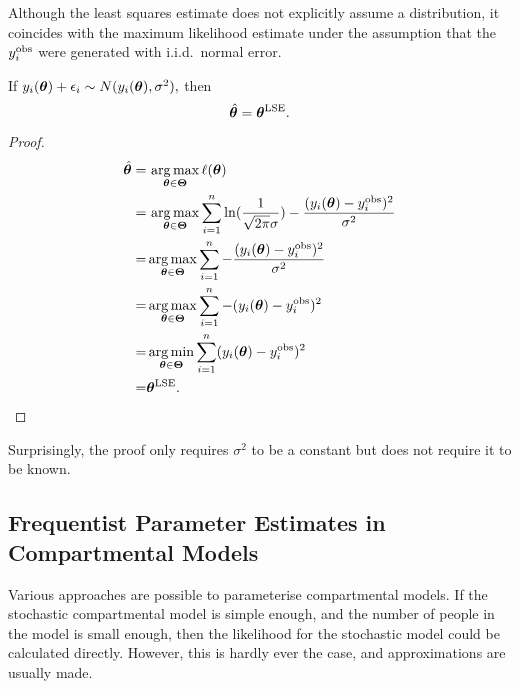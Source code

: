 Although the least squares estimate does not explicitly assume a distribution,
it coincides with the maximum likelihood estimate under the assumption that
the $y_i^{\mathrm{obs}}$ were generated with i.i.d.\ normal error.

\begin{theorem}\label{thm:LSE_normal}
    If $y_i(\bm{\theta}) + \epsilon_i \sim N(y_i(\bm{\theta}), \sigma^2),$ then
    $$
        \hat{\bm{\theta}} = \bm{\theta}^{\mathrm{LSE}}.
    $$
\end{theorem}

\begin{proof}
    \begin{align*}
        \hat{\bm{\theta}}
        = & \, \operatorname*{arg\,max}_{\bm{\theta}\in\mathbf{\Theta}}\ell(\bm{\theta}) \\
        = & \, \operatorname*{arg\,max}_{\bm{\theta}\in\mathbf{\Theta}}
        \sum_{i = 1}^n
        \ln(\frac{1}{\sqrt{2\pi}\sigma})
        -\frac{(y_i(\bm{\theta})- y_i^{\mathrm{obs}})^2}{\sigma^2}            \\
        = & \operatorname*{arg\,max}_{\bm{\theta}\in\mathbf{\Theta}} \sum_{i = 1}^n
        - \frac{(y_i(\bm{\theta})- y_i^{\mathrm{obs}})^2 }{\sigma^2}          \\
        = & \operatorname*{arg\,max}_{\bm{\theta}\in\mathbf{\Theta}} \sum_{i = 1}^n
        - (y_i(\bm{\theta})- y_i^{\mathrm{obs}})^2                            \\
        = & \operatorname*{arg\,min}_{\bm{\theta}\in\mathbf{\Theta}} \sum_{i = 1}^n
        (y_i(\bm{\theta})- y_i^{\mathrm{obs}})^2                              \\
        = & \bm{\theta}^{\mathrm{LSE}}.
    \end{align*}
\end{proof}

Surprisingly, the proof only requires $\sigma^2$ to be a constant but does
not require it to be known.

\subsection*{Frequentist Parameter Estimates in Compartmental Models}

Various approaches are possible to parameterise compartmental models.
If the stochastic compartmental model is simple enough, and the number of
people in the model is small enough, then the likelihood
for the stochastic model could be calculated directly. However, this is hardly
ever the case, and approximations are usually made.

